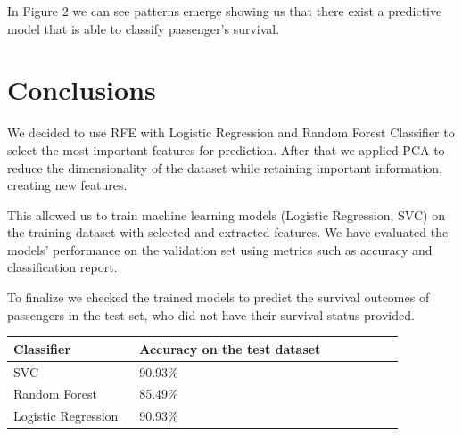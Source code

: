 \documentclass{article}
\begin{document}
In Figure 2 we can see patterns emerge showing us that there exist a predictive model that is able to classify passenger's survival.

\section{Conclusions}

We decided to use RFE with Logistic Regression and Random Forest Classifier to select the most important features for prediction. After that we applied PCA to reduce the dimensionality of the dataset while retaining important information, creating new features.

This allowed us to train machine learning models (Logistic Regression, SVC) on the training dataset with selected and extracted features. We have evaluated the models' performance on the validation set using metrics such as accuracy and classification report.

To finalize we checked the trained models to predict the survival outcomes of passengers in the test set, who did not have their survival status provided.

\begin{table}[H]
\begin{tabular}{p{0.3\linewidth} | p{0.63\linewidth}}
\hline
Classifier  & Accuracy on the test dataset\\
\hline
SVC                  & 90.93\% \\
Random Forest        & 85.49\% \\
Logistic Regression  & 90.93\% \\
\hline
\end{tabular}
\end{table}
\end{document}
